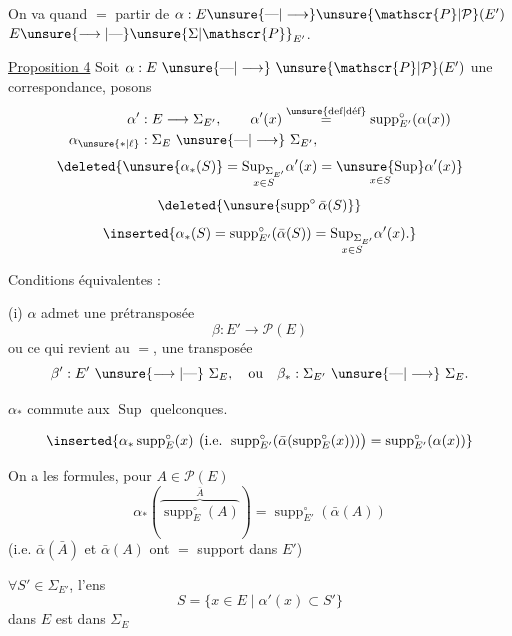On va quand $=$ partir de $\alpha:E\unsure{\text{---}|\longrightarrow}\unsure{\mathscr{P}|\mathcal{P}}(E')$  $E\unsure{\longrightarrow|\text{---}}\unsure{\Sigma|\mathscr{P}}_{E'}$.


\uline{Proposition 4} Soit $\alpha:E\ \unsure{\text{---}|\longrightarrow}\ \unsure{\mathscr{P}|\mathcal{P}}(E')$ une correspondance,  posons
\[
\begin{aligned}
\alpha' &: E\longrightarrow\Sigma_{E'},\qquad \alpha'(x)\overset{\text{\unsure{def|déf}}}=\operatorname{supp}^{\circ}_{E'}(\alpha(x))\\
\alpha_{\unsure{*|\ell}} &: \Sigma_E\ \unsure{\text{---}|\longrightarrow}\ \Sigma_{E'},
\end{aligned}
\]
\[
\deleted{\unsure{\alpha_*(S)}=\underset{x\in S}{\operatorname{Sup}_{\Sigma_{E'}}}\alpha'(x)=\underset{x\in S}{\unsure{\operatorname{Sup}}}\alpha'(x)}
\]
\[
\deleted{\unsure{\operatorname{supp}^{\circ}\bar\alpha(S)}}
\]
\[
\inserted{\alpha_*(S)=\operatorname{supp}^{\circ}_{E'}(\bar\alpha(S))=\underset{x\in S}{\operatorname{Sup}_{\Sigma_{E'}}}\alpha'(x).}
\]

Conditions équivalentes :

(i) $\alpha$ admet une prétransposée
\[
\beta:E'\longrightarrow\mathscr{P}(E)
\]
ou ce qui revient au $=$, une transposée
\[
\beta':E'\ \unsure{\longrightarrow|\text{---}}\ \Sigma_E,\quad\text{ou}\quad\beta_*:\Sigma_{E'}\ \unsure{\text{---}|\longrightarrow}\ \Sigma_E.
\]

  $\alpha_*$ commute aux $\operatorname{Sup}$ quelconques.

\[
\inserted{\alpha_*\operatorname{supp}^{\circ}_E(x)\ \bigl(\text{i.e. }\operatorname{supp}^{\circ}_{E'}(\bar\alpha(\operatorname{supp}^{\circ}_E(x)))\bigr)=\operatorname{supp}^{\circ}_{E'}(\alpha(x))}
\]

 On a les formules, pour \unsure{$\forall$} $A\in\mathscr{P}(E)$
\[
\alpha_*(\overbrace{\operatorname{supp}^{\circ}_E(A)}^{\bar A})=\operatorname{supp}^{\circ}_{E'}(\bar\alpha(A))
\]
(i.e. $\bar\alpha(\bar A)$ et $\bar\alpha(A)$ ont $=$ support dans $E'$)

 $\forall S'\in\Sigma_{E'}$, l'ens
\[
S=\{x\in E\mid\alpha'(x)\subset S'\}
\]
dans $E$ est dans $\Sigma_E$

